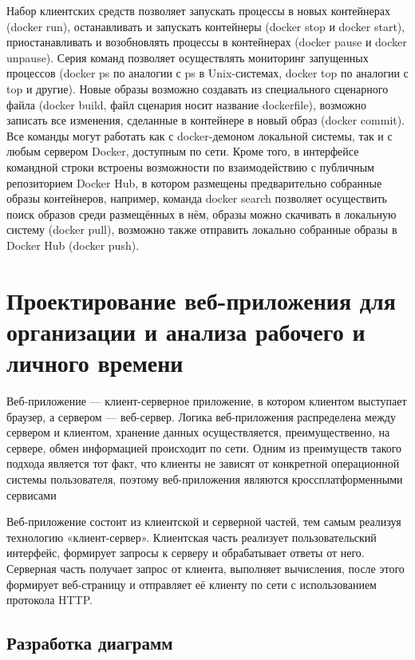 Набор клиентских средств позволяет запускать процессы в новых контейнерах (docker run), останавливать и запускать контейнеры (docker stop и docker start), приостанавливать и возобновлять процессы в контейнерах (docker pause и docker unpause). Серия команд позволяет осуществлять мониторинг запущенных процессов (docker ps по аналогии с ps в Unix-системах, docker top по аналогии с top и другие). Новые образы возможно создавать из специального сценарного файла (docker build, файл сценария носит название dockerfile), возможно записать все изменения, сделанные в контейнере в новый образ (docker commit). Все команды могут работать как с docker-демоном локальной системы, так и с любым сервером Docker, доступным по сети. Кроме того, в интерфейсе командной строки встроены возможности по взаимодействию с публичным репозиторием Docker Hub, в котором размещены предварительно собранные образы контейнеров, например, команда docker search позволяет осуществить поиск образов среди размещённых в нём, образы можно скачивать в локальную систему (docker pull), возможно также отправить локально собранные образы в Docker Hub (docker push).

\section{Проектирование веб-приложения для организации и анализа рабочего и личного времени}

Веб-приложение — клиент-серверное приложение, в котором клиентом выступает браузер, а сервером — веб-сервер. Логика веб-приложения распределена между сервером и клиентом, хранение данных осуществляется, преимущественно, на сервере, обмен информацией происходит по сети. Одним из преимуществ такого подхода является тот факт, что клиенты не зависят от конкретной операционной системы пользователя, поэтому веб-приложения являются кроссплатформенными сервисами

Веб-приложение состоит из клиентской и серверной частей, тем самым реализуя технологию «клиент-сервер». Клиентская часть реализует пользовательский интерфейс, формирует запросы к серверу и обрабатывает ответы от него. Серверная часть получает запрос от клиента, выполняет вычисления, после этого формирует веб-страницу и отправляет её клиенту по сети с использованием протокола HTTP.


\subsection{Разработка диаграмм}

